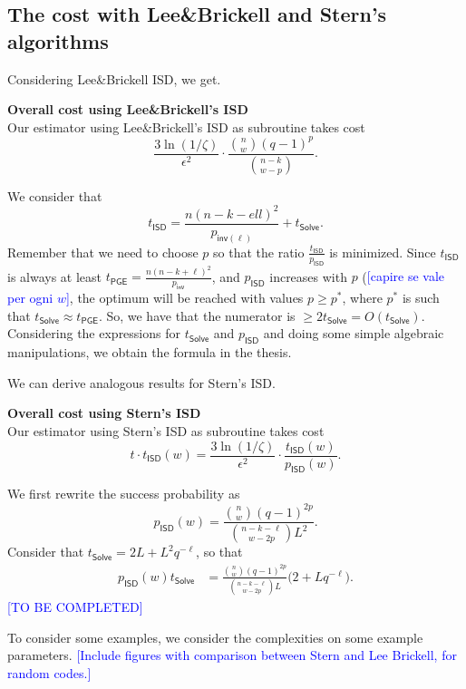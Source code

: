 \subsection{The cost with   Lee\&Brickell and Stern's algorithms}

Considering Lee\&Brickell ISD, we get.
\begin{proposition}\textbf{Overall cost using Lee\&Brickell's ISD}\\
Our estimator using Lee\&Brickell's ISD as subroutine takes cost
$$\frac{3\ln(1/\zeta)}{\epsilon^2}\cdot \frac{\binom{n}{w}(q-1)^p}{\binom{n-k}{w-p}}.$$
\end{proposition}
\begin{IEEEproof}
 We consider that $$t_{\mathsf{ISD}} = \frac{n(n-k-ell)^2}{p_{\mathsf{inv}(\ell)}}+t_{\mathsf{Solve}}.$$
 Remember that we need to choose $p$ so that the ratio $\frac{t_{\mathsf{ISD}}}{p_{\mathsf{ISD}}}$ is minimized.
 Since $t_{\mathsf{ISD}}$ is always at least $t_{\mathsf{PGE}} = \frac{n(n-k+\ell)^2}{p_{\mathsf{inv}}}$, and $p_{\mathsf{ISD}}$ increases with $p$ (\textcolor{blue}{[capire se vale per ogni $w$]}, the optimum will be reached with values $p\geq p^*$, where $p^*$ is such that $t_{\mathsf{Solve}}\approx t_{\mathsf{PGE}}$.
 So, we have that the numerator is $\geq 2 t_{\mathsf{Solve}} = O\left(t_{\mathsf{Solve}}\right)$.
 Considering the expressions for $t_{\mathsf{Solve}}$ and $p_{\mathsf{ISD}}$ and doing some simple algebraic manipulations, we obtain the formula in the thesis.
\end{IEEEproof}
We can derive analogous results for Stern's ISD.
\begin{proposition}\textbf{Overall cost using Stern's ISD}\\
Our estimator using Stern's ISD as subroutine takes cost
$$t\cdot t_{\mathsf{ISD}}(w) = \frac{3\ln(1/\zeta)}{\epsilon^2}\cdot\frac{t_{\mathsf{ISD}}(w)}{p_{\mathsf{ISD}}(w)}.$$
\end{proposition}
\begin{IEEEproof}
We first rewrite the success probability as
$$p_{\mathsf{ISD}}(w) = \frac{\binom{n}{w}(q-1)^{2p}}{\binom{n-k-\ell}{w-2p}L^2}.$$
Consider that $t_{\mathsf{Solve}} = 2L+L^2q^{-\ell}$, so that
\begin{align*}
p_{\mathsf{ISD}}(w)t_{\mathsf{Solve}} &\nonumber = \frac{\binom{n}{w}(q-1)^{2p}}{\binom{n-k-\ell}{w-2p}L}\big(2+Lq^{-\ell}\big).
\end{align*}
\textcolor{blue}{[TO BE COMPLETED]}
\end{IEEEproof}

To consider some examples, we consider the complexities on some example parameters.
\textcolor{blue}{[Include figures with comparison between Stern and Lee Brickell, for random codes.]}
